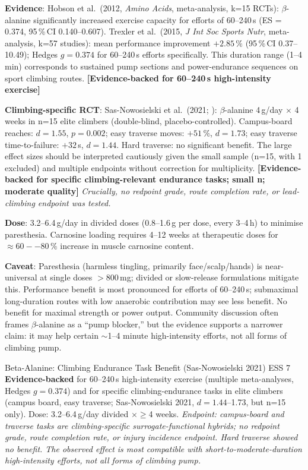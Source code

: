 \textbf{Evidence}: Hobson et al.\ (2012, \textit{Amino Acids}, meta-analysis, k=15 RCTs): $\beta$-alanine significantly increased exercise capacity for efforts of 60--240\,s (ES = 0.374, 95\,\%\,CI 0.140--0.607). Trexler et al.\ (2015, \textit{J Int Soc Sports Nutr}, meta-analysis, k=57 studies): mean performance improvement $+2.85\,\%$ (95\,\%\,CI 0.37--10.49); Hedges $g = 0.374$ for 60--240\,s efforts specifically. This duration range (1--4\,min) corresponds to sustained pump sections and power-endurance sequences on sport climbing routes. \textbf{[Evidence-backed for 60--240\,s high-intensity exercise]}

\textbf{Climbing-specific RCT}: Sas-Nowosielski et al.\ (2021; \cite{SNWK21}): $\beta$-alanine 4\,g/day $\times$ 4 weeks in n=15 elite climbers (double-blind, placebo-controlled). Campus-board reaches: $d{=}1.55$, $p{=}0.002$; easy traverse moves: $+51\,\%$, $d{=}1.73$; easy traverse time-to-failure: $+32$\,s, $d{=}1.44$. Hard traverse: no significant benefit. The large effect sizes should be interpreted cautiously given the small sample (n=15, with 1 excluded) and multiple endpoints without correction for multiplicity. \textbf{[Evidence-backed for specific climbing-relevant endurance tasks; small n; moderate quality]} \textit{Crucially, no redpoint grade, route completion rate, or lead-climbing endpoint was tested.}

\textbf{Dose}: 3.2--6.4\,g/day in divided doses (0.8--1.6\,g per dose, every 3--4\,h) to minimise paresthesia. Carnosine loading requires 4--12 weeks at therapeutic doses for ${\approx}60--80\,\%$ increase in muscle carnosine content.

\textbf{Caveat}: Paresthesia (harmless tingling, primarily face/scalp/hands) is near-universal at single doses $>$800\,mg; divided or slow-release formulations mitigate this. Performance benefit is most pronounced for efforts of 60--240\,s; submaximal long-duration routes with low anaerobic contribution may see less benefit. No benefit for maximal strength or power output. Community discussion often frames $\beta$-alanine as a ``pump blocker,'' but the evidence supports a narrower claim: it may help certain $\sim$1--4 minute high-intensity efforts, not all forms of climbing pump.

\begin{evidencebox}{Beta-Alanine: Climbing Endurance Task Benefit (Sas-Nowosielski 2021) \cdot \evidencebacked \cdot ESS 7}
\textbf{Evidence-backed} for 60--240\,s high-intensity exercise (multiple meta-analyses, Hedges $g = 0.374$) and for specific climbing-endurance tasks in elite climbers (campus board, easy traverse; Sas-Nowosielski 2021, $d = 1.44$--1.73, but n=15 only). Dose: 3.2--6.4\,g/day divided $\times \geq$4 weeks. \textit{Endpoint: campus-board and traverse tasks are climbing-specific surrogate-functional hybrids; no redpoint grade, route completion rate, or injury incidence endpoint. Hard traverse showed no benefit. The observed effect is most compatible with short-to-moderate-duration high-intensity efforts, not all forms of climbing pump.}
\end{evidencebox}

